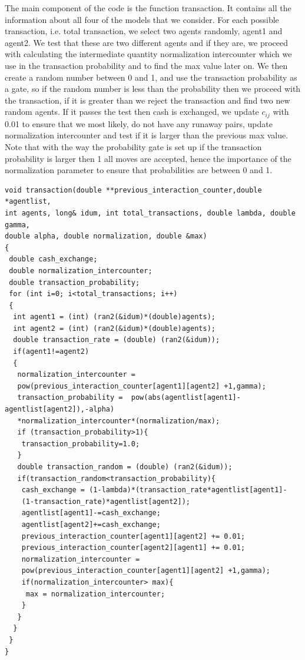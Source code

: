 \documentclass[a4paper,11pt]{article}
\begin{document}
{The main component of the code is the function transaction. It contains all the information about all four of the models that we consider. For each possible transaction, i.e. total transaction, we select two agents randomly, agent1 and agent2. We test that these are two different agents and if they are, we proceed with calculating the intermediate quantity normalization intercounter which we use in the transaction probability and to find the max value later on. We then create a random number between 0 and 1, and use the transaction probability as a gate, so if the random number is less than the probability then we proceed with the transaction, if it is greater than we reject the transaction and find two new random agents. If it passes the test then cash is exchanged, we update $c_{ij}$ with 0.01 to ensure that we most likely, do not have any runaway pairs, update normalization intercounter and test if it is larger than the previous max value. Note that with the way the probability gate is set up if the transaction probability is larger then 1 all moves are accepted, hence the importance of the normalization parameter to ensure that probabilities are between 0 and 1.


\begin{lstlisting}
void transaction(double **previous_interaction_counter,double *agentlist,
int agents, long& idum, int total_transactions, double lambda, double gamma,
double alpha, double normalization, double &max)
{
 double cash_exchange;
 double normalization_intercounter;
 double transaction_probability;
 for (int i=0; i<total_transactions; i++)
 {
  int agent1 = (int) (ran2(&idum)*(double)agents);
  int agent2 = (int) (ran2(&idum)*(double)agents);
  double transaction_rate = (double) (ran2(&idum));
  if(agent1!=agent2)
  {
   normalization_intercounter = 
   pow(previous_interaction_counter[agent1][agent2] +1,gamma);
   transaction_probability =  pow(abs(agentlist[agent1]-agentlist[agent2]),-alpha)
   *normalization_intercounter*(normalization/max);
   if (transaction_probability>1){
    transaction_probability=1.0;
   }
   double transaction_random = (double) (ran2(&idum));
   if(transaction_random<transaction_probability){
    cash_exchange = (1-lambda)*(transaction_rate*agentlist[agent1]-
    (1-transaction_rate)*agentlist[agent2]);
    agentlist[agent1]-=cash_exchange;
    agentlist[agent2]+=cash_exchange;
    previous_interaction_counter[agent1][agent2] += 0.01;
    previous_interaction_counter[agent2][agent1] += 0.01;
    normalization_intercounter = 
    pow(previous_interaction_counter[agent1][agent2] +1,gamma);
    if(normalization_intercounter> max){
     max = normalization_intercounter;
    }
   }
  }
 }
}
\end{lstlisting}

}
\end{document}
